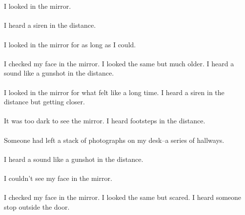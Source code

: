 \documentclass{article}
\begin{document}
    \section{}
    I looked in the mirror. \\\\I heard a siren in the distance. \\\\I looked in the mirror for as long as I could. \\\\I checked my face in the mirror. I looked the same but much older. I heard a sound like a gunshot in the distance. \\\\I looked in the mirror for what felt like a long time. I heard a siren in the distance but getting closer. \\\\It was too dark to see the mirror. I heard footsteps in the distance. \\\\Someone had left a stack of photographs on my desk--a series of hallways. \\\\I heard a sound like a gunshot in the distance. \\\\I couldn't see my face in the mirror. \\\\I checked my face in the mirror. I looked the same but scared. I heard someone stop outside the door. \\\\
    \newpage
    
\end{document}
